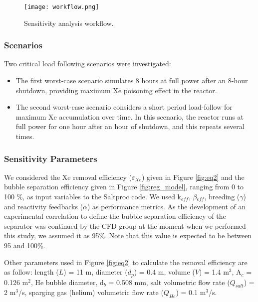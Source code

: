     \begin{figure}[htbp!]
        \begin{center}
            \texttt{[image: workflow.png]}
        \end{center}
        \caption{Sensitivity analysis workflow.}
        \label{fig:workflow}
    \end{figure}

\subsubsection{Scenarios}

    Two critical load following scenarios were investigated:
    \begin{itemize}
        \item The first worst-case scenario simulates 8 hours at full power after an 8-hour shutdown, providing maximum Xe poisoning effect in the reactor.
        \item The second worst-case scenario considers a short period load-follow for maximum Xe accumulation over time. In this scenario, the reactor runs at full power for one hour after an hour of shutdown, and this repeats several times.
    \end{itemize}

\subsubsection{Sensitivity Parameters}

    We considered the Xe removal efficiency ($\varepsilon$$_{Xe}$) given in Figure \ref{fig:eq2} and the bubble separation efficiency given in Figure \ref{fig:reg_model}, ranging from 0 to 100 \%, as input variables to the Saltproc code. We used k$_{eff}$, $\beta$$_{eff}$, breeding ($\gamma$) and reactivity feedbacks ($\alpha$) as performance metrics. As the development of an experimental correlation to define the bubble separation efficiency of the separator was continued by the CFD group at the moment when we performed this study, we assumed it as 95\%. Note that this value is expected to be between 95 and 100\%.

    Other parameters used in Figure \ref{fig:eq2} to calculate the removal efficiency are as follow: length ($L$) = 11 m, diameter ($d_p$) = 0.4 m, volume ($V$) = 1.4 m$^{3}$, A$_c$ = 0.126 m$^{2}$, He bubble diameter, d$_b$ = 0.508 mm, salt volumetric flow rate ($Q_{salt}$) = 2 m$^{3}$/s, sparging gas (helium) volumetric flow rate ($Q_{He}$) = 0.1 m$^{3}$/s.

